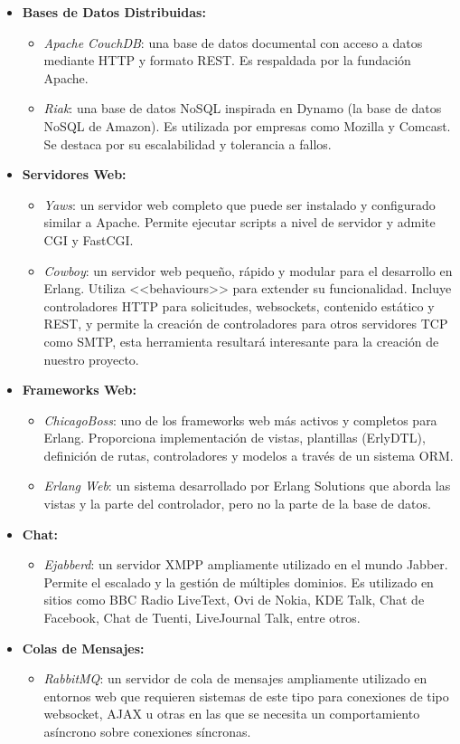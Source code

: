 \begin{itemize}
\item \textbf{Bases de Datos Distribuidas:}
\begin{itemize}
\item \textit{Apache CouchDB}: una base de datos documental con acceso a datos mediante HTTP y formato REST. Es respaldada por la fundación Apache.
\item \textit{Riak}: una base de datos NoSQL inspirada en Dynamo (la base de datos NoSQL de Amazon). Es utilizada por empresas como Mozilla y Comcast. Se destaca por su escalabilidad y tolerancia a fallos.
\end{itemize}
\item \textbf{Servidores Web:}
\begin{itemize}
\item \textit{Yaws}: un servidor web completo que puede ser instalado y configurado similar a Apache. Permite ejecutar scripts a nivel de servidor y admite CGI y FastCGI.
\item \textit{Cowboy}: un servidor web pequeño, rápido y modular para el desarrollo en Erlang. Utiliza <<behaviours>> para extender su funcionalidad. Incluye controladores HTTP para solicitudes, websockets, contenido estático y REST, y permite la creación de controladores para otros servidores TCP como SMTP, esta herramienta resultará interesante para la creación de nuestro proyecto.
\end{itemize}
\item \textbf{Frameworks Web:}
\begin{itemize}
\item \textit{ChicagoBoss}: uno de los frameworks web más activos y completos para Erlang. Proporciona implementación de vistas, plantillas (ErlyDTL), definición de rutas, controladores y modelos a través de un sistema ORM.
\item \textit{Erlang Web}: un sistema desarrollado por Erlang Solutions que aborda las vistas y la parte del controlador, pero no la parte de la base de datos.
\end{itemize}

\item \textbf{Chat:}
\begin{itemize}
\item \textit{Ejabberd}: un servidor XMPP ampliamente utilizado en el mundo Jabber. Permite el escalado y la gestión de múltiples dominios. Es utilizado en sitios como BBC Radio LiveText, Ovi de Nokia, KDE Talk, Chat de Facebook, Chat de Tuenti, LiveJournal Talk, entre otros.
\end{itemize}
\item \textbf{Colas de Mensajes:}
\begin{itemize}
\item \textit{RabbitMQ}: un servidor de cola de mensajes ampliamente utilizado en entornos web que requieren sistemas de este tipo para conexiones de tipo websocket, AJAX u otras en las que se necesita un comportamiento asíncrono sobre conexiones síncronas.
\end{itemize}
\end{itemize}

